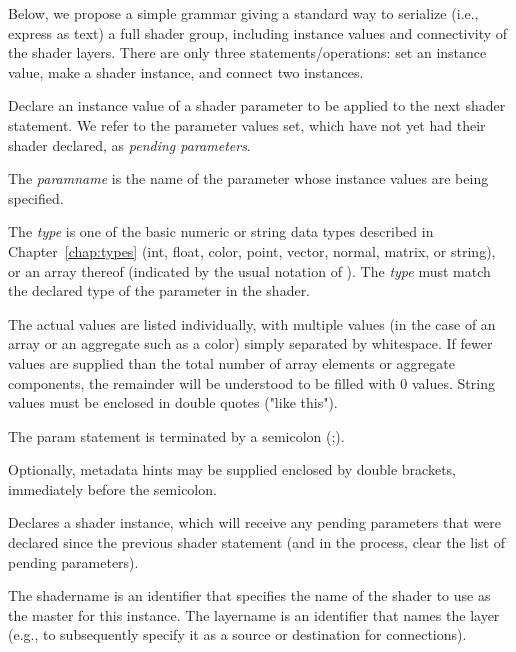 \documentclass[11pt,letterpaper]{book}
\def\color{{\cf color}\xspace}
\begin{document}
Below, we propose a simple grammar giving a standard way to serialize (i.e.,
express as text) a full shader group, including instance values and
connectivity of the shader layers. There are only three
statements/operations: set an instance value, make a shader instance, and
connect two instances.


Declare an instance value of a shader parameter to be applied to the next
{\cf shader} statement. We refer to the parameter values set, which have
not yet had their shader declared, as \emph{pending parameters}.

The \emph{paramname} is the name of the parameter whose instance values are
being specified.

The \emph{type} is one of the basic numeric or
string data types described in Chapter~\ref{chap:types} ({\cf int}, {\cf
float}, {\cf color}, {\cf point}, {\cf vector}, {\cf normal}, {\cf matrix},
or {\cf string}), or an array thereof (indicated by the usual notation of
{}). The \emph{type} must match the declared type
of the parameter in the shader.

The actual values are listed individually, with multiple values (in the
case of an array or an aggregate such as a \color) simply separated by
whitespace. If fewer values are supplied than the total number of array
elements or aggregate components, the remainder will be understood to be
filled with 0 values. String values must be enclosed in double quotes
({\cf "like this"}).

The {\cf param} statement is terminated by a semicolon ({\cf ;}).

Optionally, metadata hints may be supplied enclosed by double brackets,
immediately before the semicolon.
\apiend


Declares a shader instance, which will receive any pending parameters that
were declared since the previous {\cf shader} statement (and in the process,
clear the list of pending parameters).

The {\cf shadername} is an identifier that specifies the name of the shader
to use as the master for this instance. The {\cf layername} is an identifier
that names the layer (e.g., to subsequently specify it as a source or
destination for connections).
\end{document}
